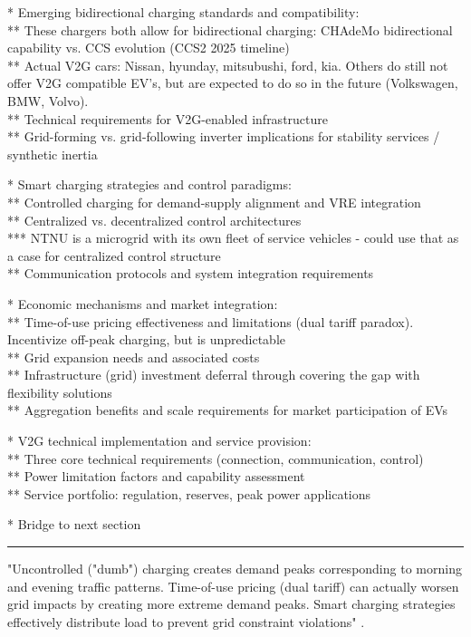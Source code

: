 * Emerging bidirectional charging standards and compatibility: \\
** These chargers both allow for bidirectional charging: CHAdeMo bidirectional capability vs. CCS evolution (CCS2 2025 timeline) \\
** Actual V2G cars: Nissan, hyunday, mitsubushi, ford, kia. Others do still not offer V2G compatible EV's, but are expected to do so in the future (Volkswagen, BMW, Volvo). \\
** Technical requirements for V2G-enabled infrastructure \\
** Grid-forming vs. grid-following inverter implications for stability services / synthetic inertia

* Smart charging strategies and control paradigms: \\
** Controlled charging for demand-supply alignment and VRE integration \\
** Centralized vs. decentralized control architectures \\
*** NTNU is a microgrid with its own fleet of service vehicles - could use that as a case for centralized control structure \\
** Communication protocols and system integration requirements

* Economic mechanisms and market integration: \\
** Time-of-use pricing effectiveness and limitations (dual tariff paradox). Incentivize off-peak charging, but is unpredictable \\
** Grid expansion needs and associated costs \\
** Infrastructure (grid) investment deferral through covering the gap with flexibility solutions \\
** Aggregation benefits and scale requirements for market participation of EVs

* V2G technical implementation and service provision: \\
** Three core technical requirements (connection, communication, control) \\
** Power limitation factors and capability assessment \\
** Service portfolio: regulation, reserves, peak power applications

* Bridge to next section


\hrule

"Uncontrolled ("dumb") charging creates demand peaks corresponding to morning and evening traffic patterns. Time-of-use pricing (dual tariff) can actually worsen grid impacts by creating more extreme demand peaks. Smart charging strategies effectively distribute load to prevent grid constraint violations" \cite{rashid_a_waraich_plug-hybrid_2013}.

